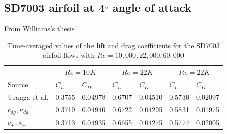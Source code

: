 \graphicspath{{figures_SD7003/}}%

\subsection{SD7003 airfoil at 4$^{\circ}$ angle of attack}
From Williams's thesis\cite{williams2013thesis}

\begin{table}[H]
\centering
\begin{tabular}{ l| l l| l l| l l} 
  
 &  \multicolumn{2}{|c|}{$Re = 10K$}  & \multicolumn{2}{|c|}{$Re = 22K$} & \multicolumn{2}{|c}{$Re = 22K$}  \\ 
 Source & $C_L$ & $C_D$ & $C_L$ & $C_D$ & $C_L$ & $C_D$   \\ 
\hline
 Uranga et al.\cite{uranga2011implicit} & 0.3755 & 0.04978 & 0.6707 & 0.04510 & 0.5730 & 0.02097  \\ 
$c_{dg},\kappa_{dg}$ & 0.3719 & 0.04940 & 0.6722 & 0.04295 & 0.5831 & 0.01975 \\ 
$c_{+},\kappa_{+}$ & 0.3713 & 0.04935 & 0.6655 & 0.04275 & 0.5774 & 0.02005  \\ 
 \end{tabular}
\caption{Time-averaged values of the lift and drag coefficients for the SD7003 airfoil flows with $Re = 10,000, 22,000, 60,000$}
\label{table:sdAirfoilForce} 
 \end{table}

